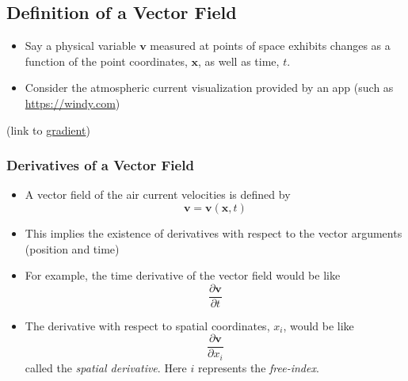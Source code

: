 \documentclass[11pt]{article}
\begin{document}
\subsection*{Definition of a Vector Field}
\label{sec:org433f1f1}
\begin{itemize}
\item Say a physical variable \(\boldsymbol{v}\) measured at points of space exhibits changes as a function of the point coordinates, \(\boldsymbol{x}\), as well as time, \(t\).
\end{itemize}
\begin{itemize}
\item Consider the atmospheric current visualization provided by an app (such as \url{https://windy.com})
\end{itemize}
(link to \hyperref[sec:org5778fe1]{gradient})
\subsubsection*{Derivatives of a Vector Field}
\label{sec:org59d3364}
\begin{itemize}
\item A vector field of the air current velocities is defined by
$$ \boldsymbol{v} = \boldsymbol{v}(\boldsymbol{x},t) $$
\item This implies the existence of derivatives with respect to the vector arguments (position and time)
\item For example, the time derivative of the vector field would be like
$$ \frac{\partial \boldsymbol{v}}{\partial t} $$
\item The derivative with respect to spatial coordinates, \(x_i\), would be like
$$ \frac{\partial \boldsymbol{v}}{\partial x_i} $$
called the \emph{spatial derivative}. Here \(i\) represents the \emph{free-index}.
\end{itemize}
\end{document}
